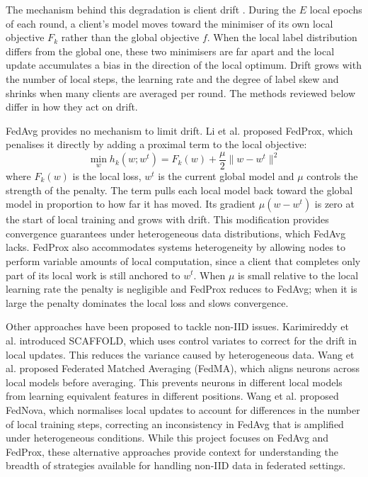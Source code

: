 \documentclass[12pt,openany,a4paper]{book}
\begin{document}
The mechanism behind this degradation is client drift \cite{karimireddySCAFFOLDStochasticControlled2021}. During the $E$ local epochs of each round, a client's model moves toward the minimiser of its own local objective $F_k$ rather than the global objective $f$. When the local label distribution differs from the global one, these two minimisers are far apart and the local update accumulates a bias in the direction of the local optimum. Drift grows with the number of local steps, the learning rate and the degree of label skew and shrinks when many clients are averaged per round. The methods reviewed below differ in how they act on drift.
 
FedAvg provides no mechanism to limit drift. Li et al. \cite{liFederatedOptimizationHeterogeneous2020} proposed FedProx, which penalises it directly by adding a proximal term to the local objective:
\begin{equation}
\min_{w} h_k(w; w^t) = F_k(w) + \frac{\mu}{2} \| w - w^t \|^2
\end{equation}
where $F_k(w)$ is the local loss, $w^t$ is the current global model and $\mu$ controls the strength of the penalty. The term pulls each local model back toward the global model in proportion to how far it has moved. Its gradient $\mu(w - w^t)$ is zero at the start of local training and grows with drift. This modification provides convergence guarantees under heterogeneous data distributions, which FedAvg lacks. FedProx also accommodates systems heterogeneity by allowing nodes to perform variable amounts of local computation, since a client that completes only part of its local work is still anchored to $w^t$. When $\mu$ is small relative to the local learning rate the penalty is negligible and FedProx reduces to FedAvg; when it is large the penalty dominates the local loss and slows convergence.


Other approaches have been proposed to tackle non-IID issues. Karimireddy et al. \cite{karimireddySCAFFOLDStochasticControlled2021} introduced SCAFFOLD, which uses control variates to correct for the drift in local updates. This reduces the variance caused by heterogeneous data. Wang et al. \cite{wangFederatedLearningMatched2020} proposed Federated Matched Averaging (FedMA), which aligns neurons across local models before averaging. This prevents neurons in different local models from learning equivalent features in different positions. Wang et al. \cite{wangTacklingObjectiveInconsistency2020} proposed FedNova, which normalises local updates to account for differences in the number of local training steps, correcting an inconsistency in FedAvg that is amplified under heterogeneous conditions. While this project focuses on FedAvg and FedProx, these alternative approaches provide context for understanding the breadth of strategies available for handling non-IID data in federated settings.
\end{document}
